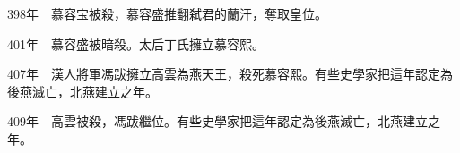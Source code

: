 398年　慕容宝被殺，慕容盛推翻弑君的蘭汗，奪取皇位。

401年　慕容盛被暗殺。太后丁氏擁立慕容熙。

407年　漢人將軍馮跋擁立高雲為燕天王，殺死慕容熙。有些史學家把這年認定為後燕滅亡，北燕建立之年。

409年　高雲被殺，馮跋繼位。有些史學家把這年認定為後燕滅亡，北燕建立之年。









